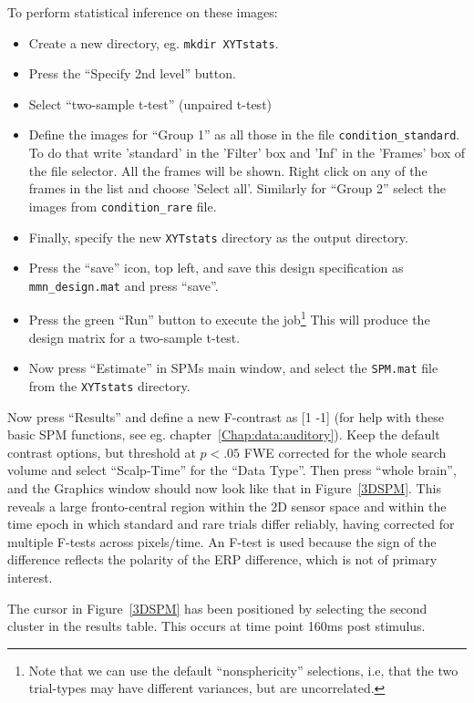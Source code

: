 To perform statistical inference on these images:
\begin{itemize}
\item{Create a new directory, eg. \texttt{mkdir XYTstats}.}
\item{Press the ``Specify 2nd level'' button.}
\item{Select ``two-sample t-test'' (unpaired t-test)}
\item{Define the images for ``Group 1'' as all those in the file  \texttt{condition\_standard}. To do that write 'standard' in the 'Filter' box and 'Inf' in the 'Frames' box of the file selector. All the frames will be shown. Right click on any of the frames in the list and choose 'Select all'. Similarly for  ``Group 2''  select the images from   \texttt{condition\_rare}  file.}
\item{Finally, specify the new \texttt{XYTstats} directory as the output directory.}
\item{Press the ``save'' icon, top left, and save this design specification as \texttt{mmn\_design.mat} and press ``save''.}
\item{Press the green ``Run'' button to execute the job\footnote{Note that we can use the default ``nonsphericity'' selections, i.e, that the two trial-types may have different variances, but are uncorrelated.} This will produce the design matrix for a two-sample t-test.}
\item{Now press ``Estimate'' in SPMs main window, and select the \texttt{SPM.mat} file from the \texttt{XYTstats} directory.}
\end{itemize}
Now press ``Results'' and define a new F-contrast as [1 -1] (for help with these basic SPM functions, see eg. chapter~\ref{Chap:data:auditory}). Keep the default contrast options, but threshold at $p<.05$ FWE corrected for the whole search volume and select ``Scalp-Time'' for the ``Data Type''. Then press ``whole brain'', and the Graphics window should now look like that in Figure~\ref{3DSPM}. This reveals a large fronto-central region within the 2D sensor space and within the time epoch in which standard and rare trials differ reliably, having corrected for multiple F-tests across pixels/time. An F-test is used because the sign of the difference reflects the polarity of the ERP difference, which is not of primary interest.

The cursor in Figure~\ref{3DSPM} has been positioned by selecting the second cluster in the results table. This occurs at time point 160ms post stimulus.

